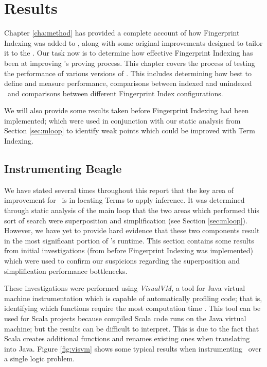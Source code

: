 
\chapter{Results}
\label{cha:results}

Chapter \ref{cha:method} has provided a complete account of how Fingerprint Indexing
was added to \beagle, along with some original improvements designed to tailor it
to the \HSWAC. Our task now is to determine how effective Fingerprint Indexing
has been at improving \beagle's proving process. This chapter covers the process
of testing the performance of various versions of \beagle. This includes determining
how best to define and measure performance, comparisons between indexed and unindexed \beagle\ and
comparisons between different Fingerprint Index configurations.

We will also provide some
results taken before Fingerprint Indexing had been implemented; which were used
in conjunction with our static analysis from Section \ref{sec:mloop} to
identify weak points which could be improved with Term Indexing.

\section{Instrumenting Beagle}
\label{section:instr}

We have stated several times throughout this report that the key area of improvement for \beagle\
is in locating Terms to apply inference. It was determined through static analysis of the main loop
that the two areas which performed this sort of search were superposition and simplification (see Section \ref{sec:mloop}).
However, we have yet to provide hard evidence that these two components result in the
most significant portion of \beagle's runtime.
This section contains some results from initial investigations (from before Fingerprint Indexing
was implemented) which were used to confirm our suspicions regarding the superposition and simplification performance bottlenecks.

These investigations were performed using \emph{VisualVM}, a tool for Java virtual machine
instrumentation which is capable of automatically profiling code; that is, identifying
which functions require the most computation time \cite{visualvm}. This tool can
be used for Scala projects because compiled Scala code runs on the Java virtual machine;
but the results can be difficult to interpret. This is due to the fact that Scala
creates additional functions and renames existing ones when translating into Java.
Figure \ref{fig:visvm} shows some typical results when instrumenting \beagle\ over
a single logic problem.

